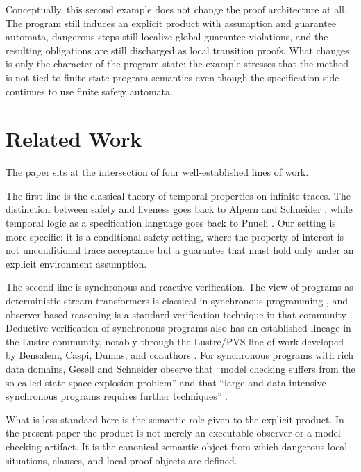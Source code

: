 \documentclass[acmsmall,screen]{acmart}
\theoremstyle{leftplain}
\theoremstyle{leftdefinition}
\theoremstyle{leftremark}
\begin{document}
Conceptually, this second example does not change the proof architecture at
all. The program still induces an explicit product with assumption and
guarantee automata, dangerous steps still localize global guarantee violations,
and the resulting obligations are still discharged as local transition proofs.
What changes is only the character of the program state: the example stresses
that the method is not tied to finite-state program semantics even though the
specification side continues to use finite safety automata.

\section{Related Work}\label{sec:related}
The paper sits at the intersection of four well-established lines of work.

The first line is the classical theory of temporal properties on infinite
traces. The distinction between safety and liveness goes back to Alpern and
Schneider \cite{alpern-schneider}, while temporal logic as a specification
language goes back to Pnueli \cite{pnueli-1977}. Our setting is more specific:
it is a conditional safety setting, where the property of interest is not
unconditional trace acceptance but a guarantee that must hold only under an
explicit environment assumption.

The second line is synchronous and reactive verification. The view of programs
as deterministic stream transformers is classical in synchronous programming
\cite{halbwachs-1991,berry-benveniste-sync}, and observer-based reasoning is a
standard verification technique in that community
\cite{safecomp-observers}. Deductive verification of synchronous programs also
has an established lineage in the Lustre community, notably through the
Lustre/PVS line of work developed by Bensalem, Caspi, Dumas, and
coauthors \cite{lustre-pvs-methodology,lustre-pvs-obligation-generator,dumas-canovas-thesis}.
For synchronous programs with rich data domains, Gesell and Schneider observe
that ``model checking suffers from the so-called state-space explosion
problem'' and that ``large and data-intensive synchronous programs requires
further techniques'' \cite{gesell-schneider-synchronous-hoare}.

What is less standard here is the semantic role
given to the explicit product. In the present paper the product is not merely
an executable observer or a model-checking artifact. It is the canonical
semantic object from which dangerous local situations, clauses, and local proof
objects are defined.
\end{document}
